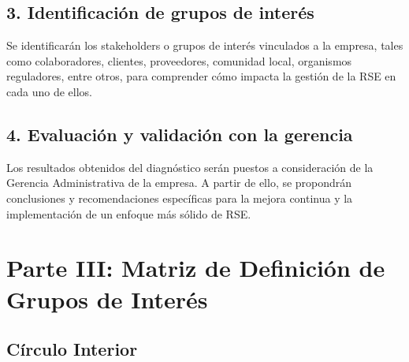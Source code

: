 \documentclass[a4paber,12pt]{article}
\begin{document}
	\subsection*{3. Identificación de grupos de interés}
	Se identificarán los stakeholders o grupos de interés vinculados a la empresa, tales como colaboradores, clientes, proveedores, comunidad local, organismos reguladores, entre otros, para comprender cómo impacta la gestión de la RSE en cada uno de ellos.
	
	\subsection*{4. Evaluación y validación con la gerencia}
	Los resultados obtenidos del diagnóstico serán puestos a consideración de la Gerencia Administrativa de la empresa. A partir de ello, se propondrán conclusiones y recomendaciones específicas para la mejora continua y la implementación de un enfoque más sólido de RSE.
	
	
	\section*{Parte III: Matriz de Definición de Grupos de Interés}
	
	\subsection*{Círculo Interior}
	
\end{document}
